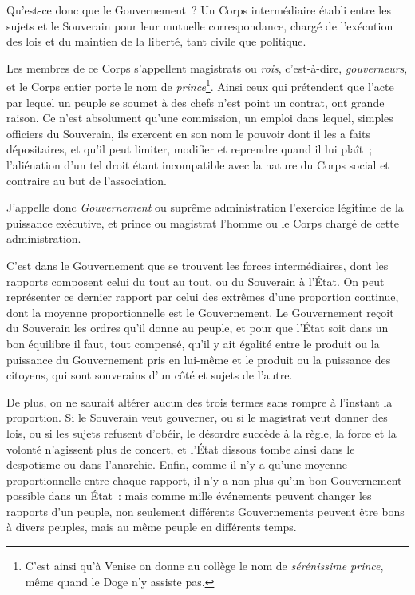 \documentclass[french,twoside]{book} %
\begin{document}
Qu’est-ce donc que le Gouvernement ? Un Corps intermédiaire établi entre les sujets et le Souverain pour leur mutuelle correspondance, chargé de l’exécution des lois et du maintien de la liberté, tant civile que politique.\par
Les membres de ce Corps s’appellent magistrats ou {\itshape rois}, c’est-à-dire, {\itshape gouverneurs}, et le Corps entier porte le nom de {\itshape prince}\footnote{C’est ainsi qu’à Venise on donne au collège le nom de {\itshape sérénissime prince}, même quand le Doge n’y assiste pas.}. Ainsi ceux qui prétendent que l’acte par lequel un peuple se soumet à des chefs n’est point un contrat, ont grande raison. Ce n’est absolument qu’une commission, un emploi dans lequel, simples officiers du Souverain, ils exercent en son nom le pouvoir dont il les a faits dépositaires, et qu’il peut limiter, modifier et reprendre quand il lui plaît ; l’aliénation d’un tel droit étant incompatible avec la nature du Corps social et contraire au but de l’association.\par
J’appelle donc {\itshape Gouvernement} ou suprême administration l’exercice légitime de la puissance exécutive, et prince ou magistrat l’homme ou le Corps chargé de cette administration.\par
C’est dans le Gouvernement que se trouvent les forces intermédiaires, dont les rapports composent celui du tout au tout, ou du Souverain à l’État. On peut représenter ce dernier rapport par celui des extrêmes d’une proportion continue, dont la moyenne proportionnelle est le Gouvernement. Le Gouvernement reçoit du Souverain les ordres qu’il donne au peuple, et pour que l’État soit dans un bon équilibre il faut, tout compensé, qu’il y ait égalité entre le produit ou la puissance du Gouvernement pris en lui-même et le produit ou la puissance des citoyens, qui sont souverains d’un côté et sujets de l’autre.\par
De plus, on ne saurait altérer aucun des trois termes sans rompre à l’instant la proportion. Si le Souverain veut gouverner, ou si le magistrat veut donner des lois, ou si les sujets refusent d’obéir, le désordre succède à la règle, la force et la volonté n’agissent plus de concert, et l’État dissous tombe ainsi dans le despotisme ou dans l’anarchie. Enfin, comme il n’y a qu’une moyenne proportionnelle entre chaque rapport, il n’y a non plus qu’un bon Gouvernement possible dans un État : mais comme mille événements peuvent changer les rapports d’un peuple, non seulement différents Gouvernements peuvent être bons à divers peuples, mais au même peuple en différents temps.\par
\end{document}
